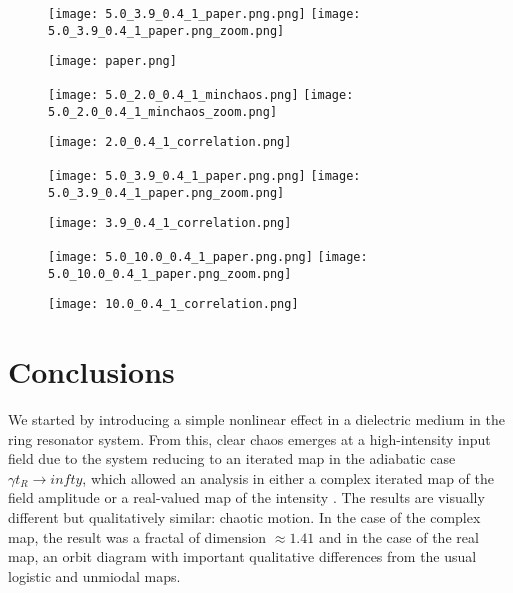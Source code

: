 \documentclass[12pt]{article}
\begin{document}
\begin{figure}[htbp]
\centerline{\texttt{[image: 5.0\_3.9\_0.4\_1\_paper.png.png]} \texttt{[image: 5.0\_3.9\_0.4\_1\_paper.png\_zoom.png]}}
\centerline{\texttt{[image: paper.png]}}
\caption[]{\label{fig:paper-comp}}
\end{figure}

\begin{figure}[htbp]
\centerline{\texttt{[image: 5.0\_2.0\_0.4\_1\_minchaos.png]} \texttt{[image: 5.0\_2.0\_0.4\_1\_minchaos\_zoom.png]}}
\centerline{\texttt{[image: 2.0\_0.4\_1\_correlation.png]}}
\caption[]{\label{fig:min-chaos}}
\end{figure}

\begin{figure}[htbp]
\centerline{\texttt{[image: 5.0\_3.9\_0.4\_1\_paper.png.png]} \texttt{[image: 5.0\_3.9\_0.4\_1\_paper.png\_zoom.png]}}
\centerline{\texttt{[image: 3.9\_0.4\_1\_correlation.png]}}
\caption[]{\label{fig:paper-chaos} }
\end{figure}

\begin{figure}[htbp]
\centerline{\texttt{[image: 5.0\_10.0\_0.4\_1\_paper.png.png]} \texttt{[image: 5.0\_10.0\_0.4\_1\_paper.png\_zoom.png]}}
\centerline{\texttt{[image: 10.0\_0.4\_1\_correlation.png]}}
\caption[]{\label{fig:max-chaos}}
\end{figure}


\section*{Conclusions}
We started by introducing a simple nonlinear effect in a dielectric medium in the ring
resonator system. From this, clear chaos emerges at a high-intensity input field due to the
system reducing to an iterated map in the adiabatic case $\gamma t_R \to infty$, which
allowed an analysis in either a complex iterated map of the field amplitude \cite{ikeda_optical_1980} or a
real-valued map of the intensity \cite{harrison_chaos_1986}. The results are visually
different but qualitatively similar: chaotic motion. In the case of the complex map, the
result was a fractal of dimension $\approx 1.41$ and in the case of the real map, an orbit
diagram with important qualitative differences from the usual logistic and unmiodal maps.



\end{document}
